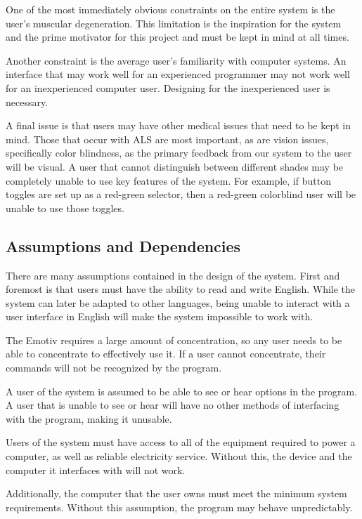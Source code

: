 \documentclass{article}
\begin{document}
One of the most immediately obvious constraints on the entire system is the
user's muscular degeneration. This limitation is the inspiration for the
system and the prime motivator for this project and must be kept in mind at
all times.

Another constraint is the average user's familiarity with computer systems. An
interface that may work well for an experienced programmer may not work well
for an inexperienced computer user. Designing for the inexperienced user is
necessary.

A final issue is that users may have other medical issues that need to be kept
in mind. Those that occur with ALS are most important, as are vision issues,
specifically color blindness, as the primary feedback from our system to the
user will be visual. A user that cannot distinguish between different shades
may be completely unable to use key features of the system. For example, if
button toggles are set up as a red-green selector, then a red-green
colorblind user will be unable to use those toggles.

\subsection{Assumptions and Dependencies}

There are many assumptions contained in the design of the system. First and
foremost is that users must have the ability to read and write English.
While the system can later be adapted to other languages, being unable to
interact with a user interface in English will make the system impossible to
work with.

The Emotiv requires a large amount of concentration, so any user needs to be
able to concentrate to effectively use it. If a user cannot concentrate,
their commands will not be recognized by the program.

A user of the system is assumed to be able to see or hear options in the
program. A user that is unable to see or hear will have no other methods of
interfacing with the program, making it unusable.

Users of the system must have access to all of the equipment required to
power a computer, as well as reliable electricity service. Without this, the
device and the computer it interfaces with will not work.

Additionally, the computer that the user owns must meet the minimum system
requirements. Without this assumption, the program may behave unpredictably.
\end{document}
